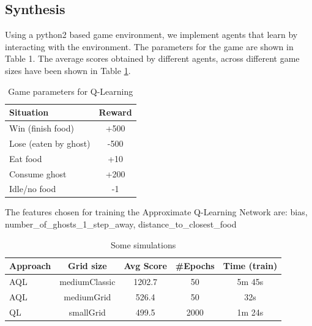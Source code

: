 \documentclass[10pt,twocolumn,letterpaper]{article}
\begin{document}
\subsection{Synthesis}
Using a python2 based game environment, we implement agents that learn by interacting with the environment. The parameters for the game are shown in Table 1. The average scores obtained by different agents, across different game sizes have been shown in Table \ref{tab:qlres}.


\begin{table}[!th]
\begin{center}
\begin{tabular}{|l|c|}
\hline
Situation & Reward \\
\hline\hline
Win (finish food) & +500 \\
Lose (eaten by ghost) & -500 \\
Eat food & +10\\
Consume ghost & +200\\
Idle/no food & -1\\
\hline
\end{tabular}
\end{center}
\caption{Game parameters for Q-Learning}
\end{table}
The features chosen for training the Approximate Q-Learning Network are: bias, number\_of\_ghosts\_1\_step\_away, distance\_to\_closest\_food
\begin{table}[!th]
\begin{center}
\begin{tabular}{|l|c|c|c|c|}
\hline
Approach & Grid size & Avg Score & \#Epochs & Time (train)\\
\hline\hline
AQL & mediumClassic & 1202.7 & 50 & 5m 45s\\
AQL & mediumGrid & 526.4 & 50 & 32s \\
QL & smallGrid & 499.5 & 2000 & 1m 24s\\
\hline
\end{tabular}
\end{center}
\caption{Some simulations}
\label{tab:qlres}
\end{table}
\end{document}
